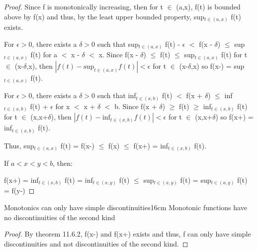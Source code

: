     \begin{proof}
        \small
        Since f is monotonically increasing, then for t $\in$ (a,x),
        f(t) is bounded above by f(x) and thus, by the least upper bounded
        property, sup$_{t \in (a,x)}$ f(t) exists.

        For $\epsilon > 0$, there exists a $\delta > 0$ such that
        sup$_{t \in (a,x)}$ f(t) - $\epsilon$
        $<$ f(x - $\delta$)
        $\leq$ sup$_{t \in (a,x)}$ f(t)
        for a $<$ x - $\delta$ $<$ x.
        Since f(x - $\delta$) $\leq$ f(t) $\leq$ sup$_{t \in (a,x)}$ f(t)
        for t $\in$ (x-$\delta$,x), then
        $|f(t) - \text{sup}_{t \in (a,x)} f(t)| < \epsilon$ for
        t $\in$ (x-$\delta$,x) so f(x-) = sup$_{t \in (a,x)}$ f(t).

        For $\epsilon > 0$, there exists a $\delta > 0$ such that
        inf$_{t \in (x,b)}$ f(t)
        $<$ f(x + $\delta$)
        $\leq$ inf$_{t \in (x,b)}$ f(t) + $\epsilon$
        for x $<$ x + $\delta$ $<$ b.
        Since f(x + $\delta$) $\geq$ f(t) $\geq$ inf$_{t \in (x,b)}$ f(t)
        for t $\in$ (x,x+$\delta$), then
        $|f(t) - \text{inf}_{t \in (x,b)} f(t)| < \epsilon$ for
        t $\in$ (x,x+$\delta$) so f(x+) = inf$_{t \in (x,b)}$ f(t).

        Thus,
        sup$_{t \in (a,x)}$ f(t) = f(x-)
        $\leq$ f(x)
        $\leq$ f(x+) = inf$_{t \in (x,b)}$ f(t).

        If $a < x < y < b$, then:

        \hspace{1cm}
        f(x+) = inf$_{t \in (x,b)}$ f(t)
        = inf$_{t \in (x,y)}$ f(t)
        $\leq$ sup$_{t \in (x,y)}$ f(t)
        = sup$_{t \in (a,y)}$ f(t)
        = f(y-)
    \end{proof}

    \newpage



    \begin{corollary}{Monotonics can only have simple discontinuities}{16cm}
        Monotonic functions have no discontinuities of the second kind
    \end{corollary}

    \begin{proof}
        By {\color{red} theorem 11.6.2}, f(x-) and f(x+) exists and thus,
        f can only have simple discontinuities and not discontinuities
        of the second kind.
    \end{proof}

    \vspace{0.5cm}



